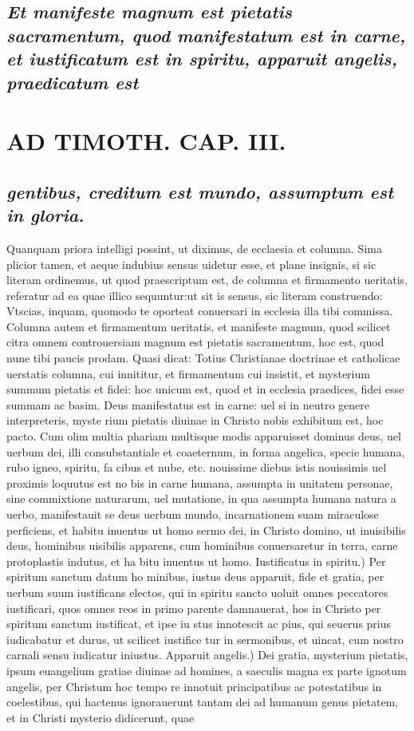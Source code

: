\documentclass{article}
\begin{document}
\begin{pages}
\subsection*{\textit{Et manifeste magnum est pietatis sacramentum, quod manifestatum est in carne, et iustificatum est in spiritu, apparuit angelis, praedicatum est}}
\section*{AD TIMOTH. CAP. III. }
\marginpar{[ p.503 ]}
{}
\subsection*{\textit{gentibus, creditum est mundo, assumptum est in gloria. }}\pstart Quanquam priora intelligi possint, ut diximus, de ecclaesia et columna. Sima plicior tamen, et aeque indubius sensus uidetur esse, et plane insignis, si sic literam ordinemus, ut quod praescriptum est, de columna et firmamento ueritatis, referatur ad ea quae illico sequuntur:ut sit is sensus, sic literam construendo: Vtscias, inquam, quomodo te oporteat conuersari in ecclesia illa tibi commissa. Columna autem et firmamentum ueritatis, et manifeste magnum, quod scilicet citra omnem controuersiam magnum est pietatis sacramentum, hoc est, quod nune tibi paucis prodam. Quasi dicat: Totius Christianae doctrinae et catholicae uerstatis columna, cui innititur, et firmamentum cui insistit, et mysterium summum pietatis et fidei: hoc unicum est, quod et in ecclesia praedices, fidei esse summam ac basim. Deus manifestatus est in carne: uel si in neutro genere interpreteris, myste rium pietatis diuinae in Christo nobis exhibitum est, hoc pacto. Cum olim multia phariam multisque modis apparuisset dominus deus, uel uerbum dei, illi consubstantiale et coaeternum, in forma angelica, specie humana, rubo igneo, spiritu, fa cibus et nube, etc. nouissime diebus istis nouissimis uel proximis loquutus est no bis in carne humana, assumpta in unitatem personae, sine commixtione naturarum, uel mutatione, in qua assumpta humana natura a uerbo, manifestauit se deus uerbum mundo, incarnationem suam miraculose perficiens, et habitu inuentus ut homo sermo dei, in Christo domino, ut inuisibilis deus, hominibus uisibilis apparens, cum hominibus conuersaretur in terra, carne protoplastis indutus, et ha bitu inuentus ut homo. Iustificatus in spiritu.) Per spiritum sanctum datum ho minibus, iustus deus apparuit, fide et gratia, per uerbum suum iustificans electos, qui in spiritu sancto uoluit omnes peccatores iustificari, quos omnes reos in primo parente damnauerat, hos in Christo per spiritum sanctum iustificat, et ipse iu stus innotescit ac pius, qui seuerus prius iudicabatur et durus, ut scilicet iustifice tur in sermonibus, et uincat, cum nostro carnali sensu iudicatur iniustus. Apparuit angelis.) Dei gratia, mysterium pietatis, ipsum euangelium gratiae diuinae ad homines, a saeculis magna ex parte ignotum angelis, per Christum hoc tempo re innotuit principatibus ac potestatibus in coelestibus, qui hactenus ignorauerunt tantam dei ad humanum genus pietatem, et in Christi mysterio didicerunt, quae 
\end{pages}
\end{document}

